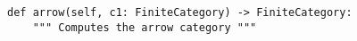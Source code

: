 \begin{verbatim}
def arrow(self, c1: FiniteCategory) -> FiniteCategory:
    """ Computes the arrow category """
\end{verbatim}